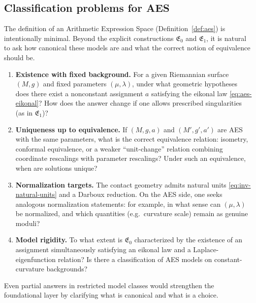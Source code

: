 
\subsection{Classification problems for AES}\label{subsec:outlook-classification}

The definition of an Arithmetic Expression Space (Definition~\ref{def:aes}) is intentionally minimal. Beyond the explicit constructions $\mathfrak{E}_0$ and $\mathfrak{E}_1$, it is natural to ask how canonical these models are and what the correct notion of equivalence should be.

\begin{enumerate}
    \item \textbf{Existence with fixed background.} For a given Riemannian surface $(M,g)$ and fixed parameters $(\mu,\lambda)$, under what geometric hypotheses does there exist a nonconstant assignment $a$ satisfying the eikonal law \eqref{eq:aes-eikonal}? How does the answer change if one allows prescribed singularities (as in $\mathfrak{E}_1$)?
    \item \textbf{Uniqueness up to equivalence.} If $(M,g,a)$ and $(M',g',a')$ are AES with the same parameters, what is the correct equivalence relation: isometry, conformal equivalence, or a weaker ``unit-change'' relation combining coordinate rescalings with parameter rescalings? Under such an equivalence, when are solutions unique?
    \item \textbf{Normalization targets.} The contact geometry admits natural units \eqref{eq:inv-natural-units} and a Darboux reduction. On the AES side, one seeks analogous normalization statements: for example, in what sense can $(\mu,\lambda)$ be normalized, and which quantities (e.g.\ curvature scale) remain as genuine moduli?
    \item \textbf{Model rigidity.} To what extent is $\mathfrak{E}_0$ characterized by the existence of an assignment simultaneously satisfying an eikonal law and a Laplace-eigenfunction relation? Is there a classification of AES models on constant-curvature backgrounds?
\end{enumerate}

Even partial answers in restricted model classes would strengthen the foundational layer by clarifying what is canonical and what is a choice.

